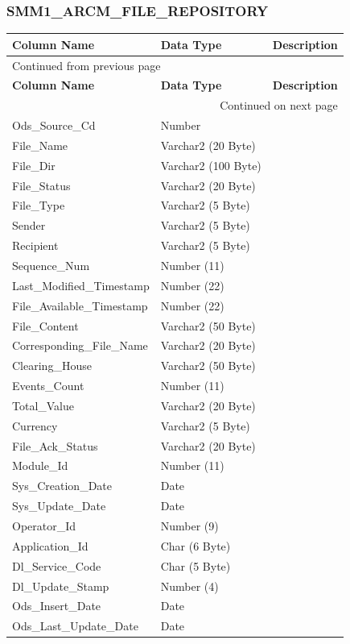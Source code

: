 \documentclass[12pt,twoside]{article}
\begin{document}
\normalsize
\subsubsection{SMM1\_ARCM\_FILE\_REPOSITORY}
\label{sec:orgheadline133}
\footnotesize

\begin{longtable}{l|l|l}
\hline
\textbf{Column Name} & \textbf{Data Type} & \textbf{Description}\\
\hline
\endfirsthead
\multicolumn{3}{l}{Continued from previous page} \\
\hline

\textbf{Column Name} & \textbf{Data Type} & \textbf{Description} \\

\hline
\endhead
\hline\multicolumn{3}{r}{Continued on next page} \\
\endfoot
\endlastfoot
\hline
Ods\_Source\_Cd & Number & \\
File\_Name & Varchar2 (20 Byte) & \\
File\_Dir & Varchar2 (100 Byte) & \\
File\_Status & Varchar2 (20 Byte) & \\
File\_Type & Varchar2 (5 Byte) & \\
Sender & Varchar2 (5 Byte) & \\
Recipient & Varchar2 (5 Byte) & \\
Sequence\_Num & Number (11) & \\
Last\_Modified\_Timestamp & Number (22) & \\
File\_Available\_Timestamp & Number (22) & \\
File\_Content & Varchar2 (50 Byte) & \\
Corresponding\_File\_Name & Varchar2 (20 Byte) & \\
Clearing\_House & Varchar2 (50 Byte) & \\
Events\_Count & Number (11) & \\
Total\_Value & Varchar2 (20 Byte) & \\
Currency & Varchar2 (5 Byte) & \\
File\_Ack\_Status & Varchar2 (20 Byte) & \\
Module\_Id & Number (11) & \\
Sys\_Creation\_Date & Date & \\
Sys\_Update\_Date & Date & \\
Operator\_Id & Number (9) & \\
Application\_Id & Char (6 Byte) & \\
Dl\_Service\_Code & Char (5 Byte) & \\
Dl\_Update\_Stamp & Number (4) & \\
Ods\_Insert\_Date & Date & \\
Ods\_Last\_Update\_Date & Date & \\
\hline
\end{longtable}
\end{document}
